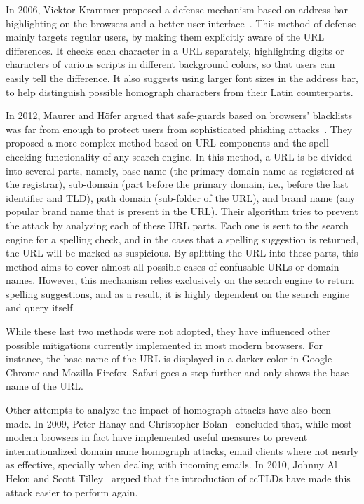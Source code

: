 \documentclass[letterpaper,twocolumn,10pt]{article}
\begin{document}
In 2006, Vicktor Krammer proposed a defense mechanism based on address bar highlighting on the browsers and a better user interface~\cite{krammer2006}.
This method of defense mainly targets regular users, by making them explicitly aware of the URL differences.
It checks each character in a URL separately, highlighting digits or characters of various scripts in different background colors, so that users can easily tell the difference.
It also suggests using larger font sizes in the address bar, to help distinguish possible homograph characters from their Latin counterparts.

In 2012, Maurer and H\"{o}fer argued that safe-guards based on browsers' blacklists was far from enough to protect users from sophisticated phishing attacks~\cite{maurer2012}.
They proposed a more complex method based on URL components and the spell checking functionality of any search engine.
In this method, a URL is be divided into several parts, namely, base name (the primary domain name as registered at the registrar), sub-domain (part before the primary domain, i.e., before the last identifier and TLD), path domain (sub-folder of the URL), and brand name (any popular brand name that is present in the URL).
Their algorithm tries to prevent the attack by analyzing each of these URL parts.
Each one is sent to the search engine for a spelling check, and in the cases that a spelling suggestion is returned, the URL will be marked as suspicious.
By splitting the URL into these parts, this method aims to cover almost all possible cases of confusable URLs or domain names.
However, this mechanism relies exclusively on the search engine to return spelling suggestions, and as a result, it is highly dependent on the search engine and query itself.

While these last two methods were not adopted, they have influenced other possible mitigations currently implemented in most modern browsers.
For instance, the base name of the URL is displayed in a darker color in Google Chrome and Mozilla Firefox.
Safari goes a step further and only shows the base name of the URL.

Other attempts to analyze the impact of homograph attacks have also been made.
In 2009, Peter Hanay and Christopher Bolan~\cite{hannay2009} concluded that, while most modern browsers in fact have implemented useful measures to prevent internationalized domain name homograph attacks, email clients where not nearly as effective, specially when dealing with incoming emails.
In 2010, Johnny Al Helou and Scott Tilley~\cite{al2010} argued that the introduction of ccTLDs have made this attack easier to perform again.
\end{document}
